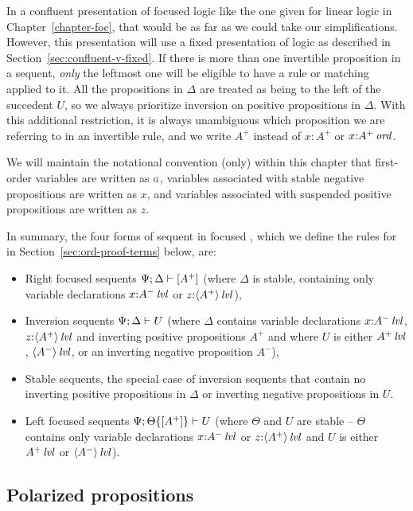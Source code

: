 In a confluent presentation of focused logic like the one given for
linear logic in Chapter~\ref{chapter-foc}, 
that would be as far as we could take our
simplifications. However, this presentation will use a fixed
presentation of logic 
as described in Section~\ref{sec:confluent-v-fixed}. 
If there is more than one
invertible proposition in a sequent, {\it only} the leftmost one will
be eligible to have a rule or matching applied to it. All the
propositions in $\Delta$ are treated as being to the left of the
succedent $U$, so we always prioritize inversion on positive
propositions in $\Delta$. With this additional restriction, it is
always unambiguous which proposition we are referring to in an
invertible rule, and we write $A^+$ instead of $x{:}A^+$ or
$x{:}{A^+}\,{{\it ord}}$.

We will maintain the notational convention (only) within this chapter that
first-order variables are written as $\lf{a}$, variables associated
with stable negative propositions are written as $x$, and variables
associated with suspended positive propositions are written as 
$z$. 

In summary,  the four forms of sequent in focused \ollll, which we define
the rules for in Section~\ref{sec:ord-proof-terms} below, are:
\smallskip
\begin{itemize}
\item Right focused sequents ${\Psi};{\Delta} \vdash {[A^+]} \mathstrut$ (where
  $\Delta$ is stable, containing only variable declarations
  $x{:}{A^-}\,{{\it lvl}}$ or $z{:}{\langle {A^+} \rangle}\,{{\it lvl}}$),
\item Inversion sequents ${\Psi};{\Delta} \vdash {U} \mathstrut$ (where $\Delta$ contains
  variable declarations $x{:}{A^-}\,{{\it lvl}}$, $z{:}{\langle {A^+} \rangle}\,{{\it lvl}}$ and
  inverting positive propositions $A^+$ and where $U$ is either 
  ${A^+}\,{{\it lvl}}$, ${\langle {A^-} \rangle}\,{{\it lvl}}$, or an inverting negative
  proposition $A^-$), 
\item Stable sequents, the special case of inversion sequents that
  contain no inverting positive propositions in $\Delta$ or inverting
  negative propositions in $U$.
\item Left focused sequents ${\Psi};{{\Theta}\{{[A^+]}\}} \vdash {U} \mathstrut$
  (where $\Theta$ and $U$ are stable -- $\Theta$ contains only
  variable declarations $x{:}{A^-}\,{{\it lvl}}$ or $z{:}{\langle {A^+} \rangle}\,{{\it lvl}}$ and
  $U$ is either ${A^+}\,{{\it lvl}}$ or ${\langle {A^-} \rangle}\,{{\it lvl}}$).
\end{itemize}


\subsection{Polarized propositions}
\label{sec:ordpolarprop}

